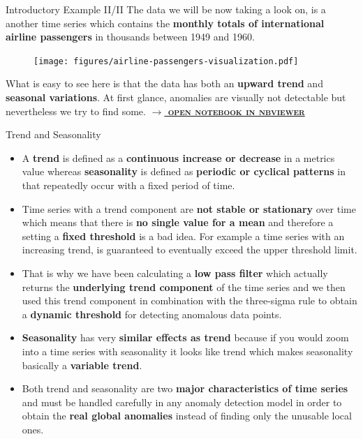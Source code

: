 \documentclass[document.tex]{subfiles}
\begin{document}
    \begin{frame}{Introductory Example II/II}
        The data we will be now taking a look on, is a another time series which contains the \textbf{monthly totals of international airline passengers} in thousands between 1949 and 1960.
        
        \begin{figure}
            \label{airline-passengers-visualization}
            \texttt{[image: figures/airline-passengers-visualization.pdf]}
        \end{figure}
    
        What is easy to see here is that the data has both an \textbf{upward trend} and \textbf{seasonal variations}. At first glance, anomalies are visually not detectable but nevertheless we try to find some. \href{https://nbviewer.jupyter.org/github/saschaschworm/big-data-and-data-science/blob/master/notebooks/demos/airline-passengers-stl.ipynb}{\textsc{\textbf{$\rightarrow$ open notebook in nbviewer}}}
    \end{frame}

    \begin{frame}{Trend and Seasonality}
        \begin{itemize}
            \item A \textbf{trend} is defined as a \textbf{continuous increase or decrease} in a metrics value whereas \textbf{seasonality} is defined as \textbf{periodic or cyclical patterns} in that repeatedly occur with a fixed period of time.
            \item Time series with a trend component are \textbf{not stable or stationary} over time which means that there is \textbf{no single value for a mean} and therefore a setting a \textbf{fixed threshold} is a bad idea. For example a time series with an increasing trend, is guaranteed to eventually exceed the upper threshold limit.
            \item That is why we have been calculating a \textbf{low pass filter} which actually returns the \textbf{underlying trend component} of the time series and we then used this trend component in combination with the three-sigma rule to obtain a \textbf{dynamic threshold} for detecting anomalous data points.
            \item \textbf{Seasonality} has very \textbf{similar effects as trend} because if you would zoom into a time series with seasonality it looks like trend which makes seasonality basically a \textbf{variable trend}.
            \item Both trend and seasonality are two \textbf{major characteristics of time series} and must be handled carefully in any anomaly detection model in order to obtain the \textbf{real global anomalies} instead of finding only the unusable local ones.
        \end{itemize}
    \end{frame}
\end{document}
